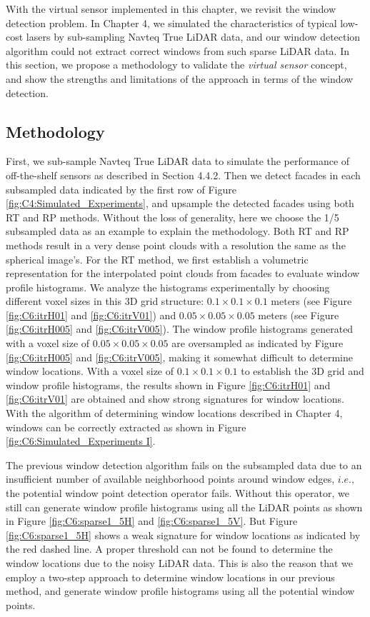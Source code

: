 With the virtual sensor implemented in this chapter, we revisit the window detection problem. In Chapter 4, we simulated the characteristics of typical low-cost lasers by sub-sampling Navteq True LiDAR data, and our window detection algorithm could not extract correct windows from such sparse LiDAR data. In this section, we propose a methodology to validate the {\it virtual sensor} concept, and show the strengths and limitations of the approach in terms of the window detection. 

\subsection{Methodology}

First, we sub-sample Navteq True LiDAR data to simulate the performance of off-the-shelf sensors as described in Section 4.4.2. Then we detect facades in each subsampled data indicated by the first row of Figure \ref{fig:C4:Simulated_Experiments}, and upsample the detected facades using both RT and RP methods. Without the loss of generality, here we choose the 1/5 subsampled data as an example to explain the methodology. Both RT and RP methods result in a very dense point clouds with a resolution the same as the spherical image's. For the RT method, we first establish a volumetric representation for the interpolated point clouds from facades to evaluate window profile histograms.  We analyze the histograms experimentally by choosing different voxel sizes in this 3D grid structure: $0.1\times0.1\times0.1$ meters (see Figure \ref{fig:C6:itrH01} and \ref{fig:C6:itrV01}) and $0.05\times0.05\times0.05$ meters (see Figure \ref{fig:C6:itrH005} and \ref{fig:C6:itrV005}). The window profile histograms generated with a voxel size of $0.05\times0.05\times0.05$ are oversampled as indicated by Figure \ref{fig:C6:itrH005} and \ref{fig:C6:itrV005}, making it somewhat difficult to determine window locations. With a voxel size of $0.1\times0.1\times0.1$ to establish the 3D grid and window profile histograms, the results shown in Figure \ref{fig:C6:itrH01} and \ref{fig:C6:itrV01} are obtained and show strong signatures for window locations. With the algorithm of determining window locations described in Chapter 4, windows can be correctly extracted as shown in Figure \ref {fig:C6:Simulated_Experiments I}.

The previous window detection algorithm fails on the subsampled data due to an insufficient number of available neighborhood points around window edges, $i.e.,$ the potential window point detection operator fails. Without this operator, we still can generate window profile histograms using all the LiDAR points as shown in Figure \ref{fig:C6:sparse1_5H} and \ref{fig:C6:sparse1_5V}. But Figure \ref{fig:C6:sparse1_5H} shows a weak signature for window locations as indicated by the red dashed line. A proper threshold can not be found to determine the window locations due to the noisy LiDAR data. This is also the reason that we employ a two-step approach to determine window locations in our previous method, and generate window profile histograms using all the potential window points. 

